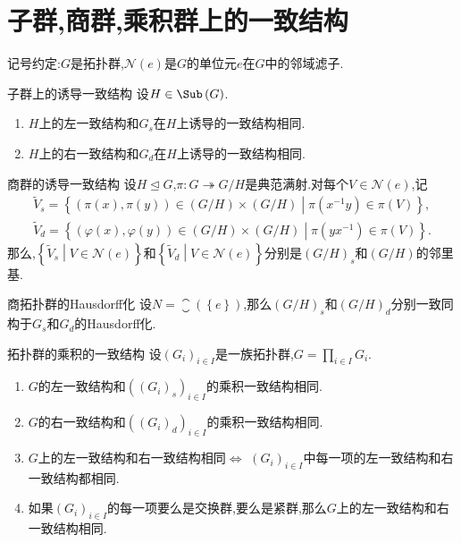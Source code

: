 \section{子群,商群,乘积群上的一致结构}

记号约定:$G$是拓扑群,$\mathcal{N}\left(e\right)$是$G$的单位元$e$在$G$中的邻域滤子.

\begin{proposition}{子群上的诱导一致结构}{}
	设$H\in\Sub\left(G\right)$.
	\begin{enumerate}
		\item $H$上的左一致结构和$G_{s}$在$H$上诱导的一致结构相同.
		\item $H$上的右一致结构和$G_{d}$在$H$上诱导的一致结构相同.
	\end{enumerate}
\end{proposition}

\begin{proposition}{商群的诱导一致结构}{}
	设$H\unlhd G$,$\pi:G\twoheadrightarrow G/H$是典范满射.对每个$V\in\mathcal{N}\left(e\right)$,记
	\begin{gather*}
		\tilde{V}_{s}=\left\{\left(\pi\left(x\right),\pi\left(y\right)\right)\in\left(G/H\right)\times\left(G/H\right)\middle|\pi\left(x^{-1}y\right)\in\pi\left(V\right)\right\},\\
		\tilde{V}_{d}=\left\{\left(\varphi\left(x\right),\varphi\left(y\right)\right)\in\left(G/H\right)\times\left(G/H\right)\middle|\pi\left(yx^{-1}\right)\in\pi\left(V\right)\right\}.
	\end{gather*}
	那么,$\left\{\tilde{V}_{s}\middle|V\in\mathcal{N}\left(e\right)\right\}$和$\left\{\tilde{V}_{d}\middle|V\in\mathcal{N}\left(e\right)\right\}$分别是$\left(G/H\right)_{s}$和$\left(G/H\right)$的邻里基.
\end{proposition}

\begin{corollary}{商拓扑群的Hausdorff化}{}
	设$N=\closure\left(\left\{e\right\}\right)$,那么$\left(G/H\right)_{s}$和$\left(G/H\right)_{d}$分别一致同构于$G_{s}$和$G_{d}$的Hausdorff化.
\end{corollary}

\begin{proposition}{拓扑群的乘积的一致结构}{}
	设$\left(G_{i}\right)_{i\in I}$是一族拓扑群,$G=\prod\limits_{i\in I}G_{i}$.
	\begin{enumerate}
		\item $G$的左一致结构和$\left(\left(G_{i}\right)_{s}\right)_{i\in I}$的乘积一致结构相同.
		\item $G$的右一致结构和$\left(\left(G_{i}\right)_{d}\right)_{i\in I}$的乘积一致结构相同.
		\item $G$上的左一致结构和右一致结构相同$\iff$ $\left(G_{i}\right)_{i\in I}$中每一项的左一致结构和右一致结构都相同.
		\item 如果$\left(G_{i}\right)_{i\in I}$的每一项要么是交换群,要么是紧群,那么$G$上的左一致结构和右一致结构相同.
	\end{enumerate}
\end{proposition}